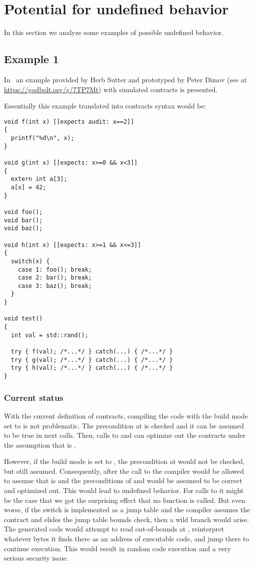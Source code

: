\section{Potential for undefined behavior}

In this section we analyze some examples of possible undefined behavior.

\subsection{Example 1}

In~\cite{p1321r0} an example provided by Herb Sutter and
prototyped by Peter Dimov (see at
\url{https://godbolt.org/g/7TP7Mt}) with simulated contracts 
is presented.

Essentially this example translated into contracts syntax would be:

\begin{lstlisting}
void f(int x) [[expects audit: x==2]]
{
  printf("%d\n", x);
}

void g(int x) [[expects: x>=0 && x<3]]
{
  extern int a[3];
  a[x] = 42;
}

void foo();
void bar();
void baz();

void h(int x) [[expects: x>=1 && x<=3]]
{
  switch(x) {
    case 1: foo(); break;
    case 2: bar(); break;
    case 3: baz(); break;
  }
}

void test()
{
  int val = std::rand();

  try { f(val); /*...*/ } catch(...) { /*...*/ }
  try { g(val); /*...*/ } catch(...) { /*...*/ }
  try { h(val); /*...*/ } catch(...) { /*...*/ }
}
\end{lstlisting}

\subsubsection{Current status}

With the current definition of contracts, compiling the code with the build mode
set to  is not problematic. The precondition at  is
checked and it can be assumed to be true in next calls. Then, calls to 
and  can optimize out the contracts under the assumption that
 is . 

However, if the build mode is set to , the precondition at
 would not be checked, but still assumed.  Consequently, after the
call to  the compiler would be allowed to assume that 
is  and the preconditions of  and  would be
assumed to be correct and optimized out.  This would lead to undefined
behavior.  For calls to  it might be the case that we got the
surprising effect that no function is called. But even worse, if the switch is
implemented as a jump table and the compiler assumes the contract and elides
the jump table bounds check, then a wild branch would arise.  The generated
code would attempt to read out-of-bounds at ,
reinterpret whatever bytes it finds there as an address of executable code, and
jump there to continue execution.  This would result in random code execution
and a very serious security issue.

